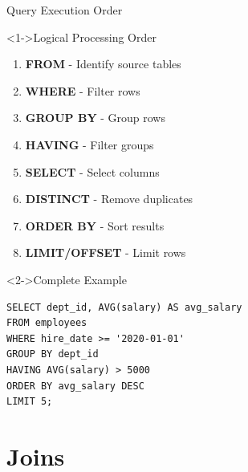 \documentclass[aspectratio=169,11pt]{beamer}
\begin{document}
\begin{frame}[fragile]{Query Execution Order}
\begin{block}<1->{Logical Processing Order}
\begin{enumerate}
    \item \textbf{FROM} - Identify source tables
    \item \textbf{WHERE} - Filter rows
    \item \textbf{GROUP BY} - Group rows
    \item \textbf{HAVING} - Filter groups
    \item \textbf{SELECT} - Select columns
    \item \textbf{DISTINCT} - Remove duplicates
    \item \textbf{ORDER BY} - Sort results
    \item \textbf{LIMIT/OFFSET} - Limit rows
\end{enumerate}
\end{block}

\pause
\begin{exampleblock}<2->{Complete Example}
\begin{lstlisting}
SELECT dept_id, AVG(salary) AS avg_salary
FROM employees
WHERE hire_date >= '2020-01-01'
GROUP BY dept_id
HAVING AVG(salary) > 5000
ORDER BY avg_salary DESC
LIMIT 5;
\end{lstlisting}
\end{exampleblock}
\end{frame}

\section{Joins}
\end{document}
